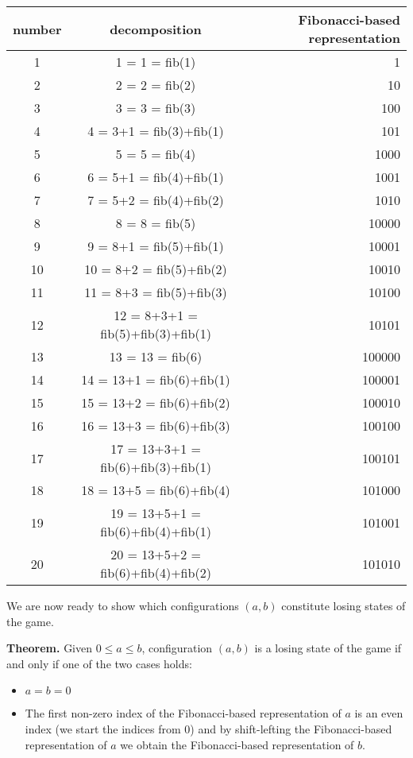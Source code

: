 \begin{solution}
\begin{center}
\begin{tabular}{|c|c|r|}
\hline
number & decomposition & Fibonacci-based representation \\
\hline
1 & 1 = 1 = fib(1) & 1 \\
\hline
2 & 2 = 2 = fib(2) & 10 \\
\hline
3 & 3 = 3 = fib(3) & 100 \\
\hline
4 & 4 = 3+1 = fib(3)+fib(1) & 101 \\
\hline
5 & 5 = 5 = fib(4) & 1000 \\
\hline
6 & 6 = 5+1 = fib(4)+fib(1) & 1001 \\
\hline
7 & 7 = 5+2 = fib(4)+fib(2) & 1010 \\
\hline
8 & 8 = 8 = fib(5) & 10000 \\
\hline
9 & 9 = 8+1 = fib(5)+fib(1) & 10001 \\
\hline
10 & 10 = 8+2 = fib(5)+fib(2) & 10010 \\
\hline
11 & 11 = 8+3 = fib(5)+fib(3) & 10100 \\
\hline
12 & 12 = 8+3+1 = fib(5)+fib(3)+fib(1) & 10101 \\
\hline
13 & 13 = 13 = fib(6) & 100000 \\
\hline
14 & 14 = 13+1 = fib(6)+fib(1) & 100001 \\
\hline
15 & 15 = 13+2 = fib(6)+fib(2) & 100010 \\
\hline
16 & 16 = 13+3 = fib(6)+fib(3) & 100100 \\
\hline
17 & 17 = 13+3+1 = fib(6)+fib(3)+fib(1) & 100101 \\
\hline
18 & 18 = 13+5 = fib(6)+fib(4) & 101000 \\
\hline
19 & 19 = 13+5+1 = fib(6)+fib(4)+fib(1) & 101001 \\
\hline
20 & 20 = 13+5+2 = fib(6)+fib(4)+fib(2) & 101010 \\
\hline
\end{tabular}
\end{center}

We are now ready to show which configurations $(a,b)$ constitute losing states of the game.

\begin{theorem}
\textbf{Theorem. }
	Given $0 \leq a \leq b$, configuration $(a,b)$ is a losing state of the game if and only if one of the two cases holds:
	\begin{itemize}
		\item $a = b = 0$
		\item  The first non-zero index of the Fibonacci-based representation of $a$ is an even index (we start the indices from 0) and by shift-lefting the Fibonacci-based representation of $a$ we obtain the Fibonacci-based representation of $b$.
	\end{itemize}
\end{theorem}


\end{solution}
